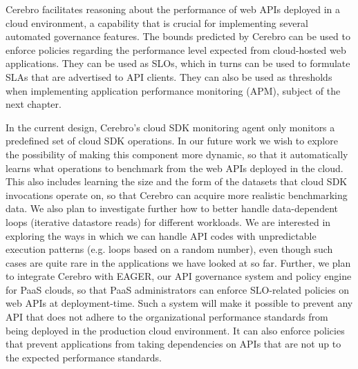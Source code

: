 Cerebro facilitates reasoning about the performance of web APIs deployed
in a cloud environment, a capability that is crucial for implementing several
automated governance features. The bounds predicted by Cerebro can be used to
enforce policies regarding the performance level expected from cloud-hosted
web applications. They can be used as SLOs, which in turns can be used to
formulate SLAs that are advertised to API clients. They can also be used as
thresholds when implementing application performance monitoring (APM),
subject of the next chapter.

In the current design, Cerebro's cloud SDK monitoring agent only monitors 
a predefined set of cloud SDK operations. In our future work we wish 
to explore the possibility of making this component more dynamic,
so that it automatically learns what operations to benchmark from the web APIs 
deployed in the cloud. This also includes learning the size and the form of the datasets
that cloud SDK invocations operate on, so that Cerebro can acquire more realistic
benchmarking data. We also plan to investigate further how to better
handle data-dependent loops (iterative datastore reads) for different workloads. We are interested
in exploring the ways in which we can handle API codes with unpredictable execution patterns (e.g.
loops based on a random number), even though such cases are quite rare in the applications we
have looked at so far.
Further, we plan
to integrate Cerebro with EAGER, our API governance system 
and policy engine for PaaS clouds, so 
that PaaS administrators can enforce SLO-related policies on web APIs at deployment-time.
Such a system will make it possible to prevent any API that 
does not adhere to the organizational performance
standards from being deployed in the production cloud environment. It can 
also enforce policies that prevent applications from taking dependencies on APIs
that are not up to the expected performance standards.